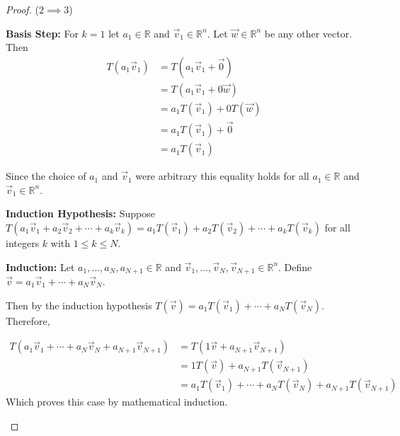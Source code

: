 \begin{proof} ($2 \implies 3$)
\begin{inparaenum}
\item[\textbf{Basis Step:}] For $k=1$ let $a_1 \in \mathbb{R}$ and
$\vec{v}_1 \in \mathbb{R}^n$. Let $\vec{w} \in \mathbb{R}^n$ be any other
vector. Then
\begin{align*}
T(a_1\vec{v}_1)&=T(a_1\vec{v}_1+\vec{0})\\
&=T(a_1\vec{v}_1+0\vec{w})\\
&=a_1T(\vec{v}_1)+0T(\vec{w})\\
&=a_1T(\vec{v}_1)+\vec{0}\\
&=a_1T(\vec{v}_1)
\end{align*}

Since the choice of $a_1$ and $\vec{v}_1$ were arbitrary this equality holds
for all $a_1 \in \mathbb{R}$ and $\vec{v}_1 \in \mathbb{R}^n$.\\[10pt]
%                                                                                                                                                                       
\item[\textbf{Induction Hypothesis: }] Suppose \\
$T(a_1\vec{v}_1+a_2\vec{v}_2+\cdots+a_k\vec{v}_k)=                                                                                                                      
a_1T(\vec{v}_1)+a_2T(\vec{v}_2)+\cdots+a_kT(\vec{v}_k)$ for all integers $k$
with $1 \le k \le N$. \\[10pt]
%                                                                                                                                                                       
\item[\textbf{Induction: }]Let $a_1, \ldots, a_N,a_{N+1} \in \mathbb{R}$ and
$\vec{v}_1,\ldots,\vec{v}_N,\vec{v}_{N+1} \in \mathbb{R}^n$. Define
$\vec{v}=a_1\vec{v}_1+\cdots+a_N\vec{v}_N$.

Then by the induction hypothesis $T(\vec{v})=a_1T(\vec{v}_1)+\cdots+a_NT(\vec{v}_N)$. Therefore,

\begin{align*}
T(a_1\vec{v}_1+\cdots+a_N\vec{v}_N+a_{N+1}\vec{v}_{N+1})
&=T(1\vec{v}+a_{N+1}\vec{v}_{N+1})\\
&=1T(\vec{v})+a_{N+1}T(\vec{v}_{N+1})\\
&=a_1T(\vec{v}_1)+\cdots+a_NT(\vec{v}_N)+a_{N+1}T(\vec{v}_{N+1})
\end{align*}
Which proves this case by mathematical induction.
\end{inparaenum}
\end{proof}
